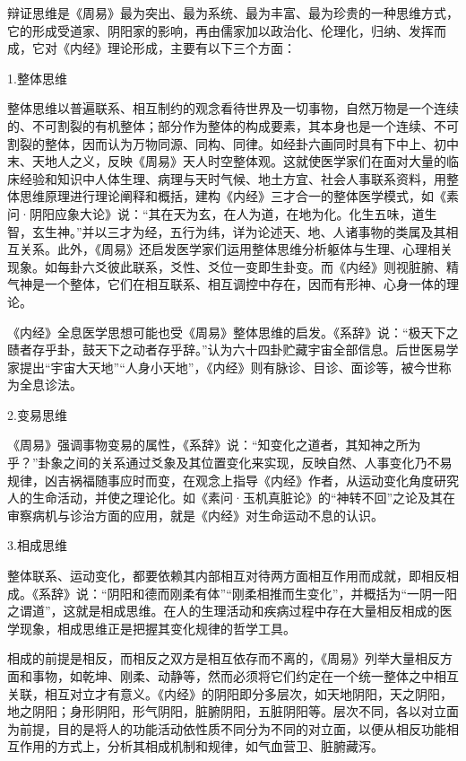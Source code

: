\documentclass[draft,12pt]{ctexbook}
\begin{document}
辩证思维是《周易》最为突出、最为系统、最为丰富、最为珍贵的一种思维方式，它的形成受道家、阴阳家的影响，再由儒家加以政治化、伦理化，归纳、发挥而成，它对《内经》理论形成，主要有以下三个方面：

1.整体思维

整体思维以普遍联系、相互制约的观念看待世界及一切事物，自然万物是一个连续的、不可割裂的有机整体；部分作为整体的构成要素，其本身也是一个连续、不可割裂的整体，因而认为万物同源、同构、同律。如经卦六画同时具有下中上、初中末、天地人之义，反映《周易》天人时空整体观。这就使医学家们在面对大量的临床经验和知识中人体生理、病理与天时气候、地土方宜、社会人事联系资料，用整体思维原理进行理论阐释和概括，建构《内经》三才合一的整体医学模式，如《素问·阴阳应象大论》说：“其在天为玄，在人为道，在地为化。化生五味，道生智，玄生神。”并以三才为经，五行为纬，详为论述天、地、人诸事物的类属及其相互关系。此外，《周易》还启发医学家们运用整体思维分析躯体与生理、心理相关现象。如每卦六爻彼此联系，爻性、爻位一变即生卦变。而《内经》则视脏腑、精气神是一个整体，它们在相互联系、相互调控中存在，因而有形神、心身一体的理论。

《内经》全息医学思想可能也受《周易》整体思维的启发。《系辞》说：“极天下之赜者存乎卦，鼓天下之动者存乎辞。”认为六十四卦贮藏宇宙全部信息。后世医易学家提出“宇宙大天地”“人身小天地”，《内经》则有脉诊、目诊、面诊等，被今世称为全息诊法。

2.变易思维

《周易》强调事物变易的属性，《系辞》说：“知变化之道者，其知神之所为乎？”卦象之间的关系通过爻象及其位置变化来实现，反映自然、人事变化乃不易规律，凶吉祸福随事应时而变，在观念上指导《内经》作者，从运动变化角度研究人的生命活动，并使之理论化。如《素问·玉机真脏论》的“神转不回”之论及其在审察病机与诊治方面的应用，就是《内经》对生命运动不息的认识。

3.相成思维

整体联系、运动变化，都要依赖其内部相互对待两方面相互作用而成就，即相反相成。《系辞》说：“阴阳和德而刚柔有体”“刚柔相推而生变化”，并概括为“一阴一阳之谓道”，这就是相成思维。在人的生理活动和疾病过程中存在大量相反相成的医学现象，相成思维正是把握其变化规律的哲学工具。

相成的前提是相反，而相反之双方是相互依存而不离的，《周易》列举大量相反方面和事物，如乾坤、刚柔、动静等，然而必须将它们约定在一个统一整体之中相互关联，相互对立才有意义。《内经》的阴阳即分多层次，如天地阴阳，天之阴阳，地之阴阳；身形阴阳，形气阴阳，脏腑阴阳，五脏阴阳等。层次不同，各以对立面为前提，目的是将人的功能活动依性质不同分为不同的对立面，以便从相反功能相互作用的方式上，分析其相成机制和规律，如气血营卫、脏腑藏泻。
\end{document}
